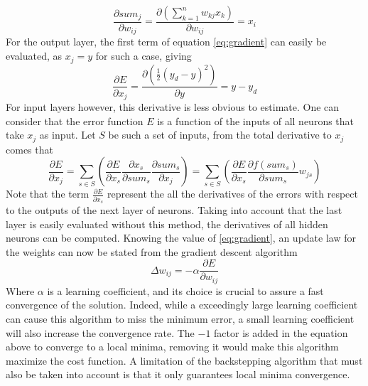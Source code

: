 \begin{equation}
\frac{\partial sum_j}{\partial w_{ij}} = \frac{\partial \left(\sum ^n_{k=1} w_{kj} x_k\right)}{\partial w_{ij}} = x_i
\end{equation}
For the output layer, the first term of equation \ref{eq:gradient} can easily be evaluated, as $x_j=y$ for such a case, giving
\begin{equation}
\frac{\partial E}{\partial x_j}=\frac{\partial (\frac{1}{2} (y_d-y)^2)}{\partial y}= y-y_d
\end{equation}
For input layers however, this derivative is less obvious to estimate. One can consider that the error function $E$ is a function of the inputs of all neurons that take $x_j$ as input. Let $S$ be such a set of inputs, from the total derivative to $x_j$ comes that
\begin{equation}
\frac{\partial E}{\partial x_j} = \sum _{s\in S}\left( \frac{\partial E}{\partial x_s}\frac{\partial x_s}{\partial sum_s}\frac{\partial sum_s}{\partial x_j}\right)=\sum _{s\in S}\left( \frac{\partial E}{\partial x_s}\frac{\partial f(sum_s)}{\partial sum_s}w_{js}\right)
\end{equation}
Note that the term $ \frac{\partial E}{\partial x_s} $ represent the all the derivatives of the errors with respect to the outputs of the next layer of neurons. Taking into account that the last layer is easily evaluated without this method, the derivatives of all hidden neurons can be computed. Knowing the value of \ref{eq:gradient}, an update law for the weights can now be stated from the gradient descent algorithm
\begin{equation}\label{eq:update_law}
\Delta w_{ij} = - \alpha \frac{\partial E}{\partial w_{ij}}
\end{equation}
Where $\alpha$ is a learning coefficient, and its choice is crucial to assure a fast convergence of the solution. Indeed, while a exceedingly large learning coefficient can cause this algorithm to miss the minimum error, a small learning coefficient will also increase the convergence rate. The $-1$ factor is added in the equation above to converge to a local minima, removing it would make this algorithm maximize the cost function. A limitation of the backstepping algorithm that must also be taken into account is that it only guarantees local minima convergence. 

